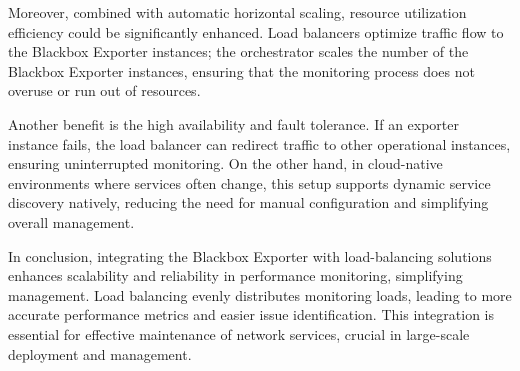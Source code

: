 Moreover, combined with automatic horizontal scaling, resource utilization efficiency could be significantly enhanced. Load balancers optimize traffic flow to the Blackbox Exporter instances; the orchestrator scales the number of the Blackbox Exporter instances, ensuring that the monitoring process does not overuse or run out of resources. 

Another benefit is the high availability and fault tolerance. If an exporter instance fails, the load balancer can redirect traffic to other operational instances, ensuring uninterrupted monitoring. On the other hand, in cloud-native environments where services often change, this setup supports dynamic service discovery natively, reducing the need for manual configuration and simplifying overall management. 

In conclusion, integrating the Blackbox Exporter with load-balancing solutions enhances scalability and reliability in performance monitoring, simplifying management. Load balancing evenly distributes monitoring loads, leading to more accurate performance metrics and easier issue identification. This integration is essential for effective maintenance of network services, crucial in large-scale deployment and management.
